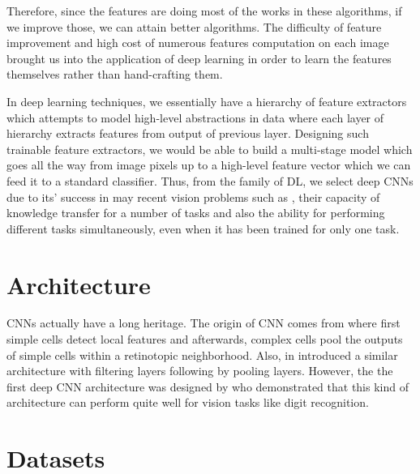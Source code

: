 \indent Therefore, since the features are doing most of the works in these algorithms, if we improve those, we can attain better algorithms. The difficulty of feature improvement and high cost of numerous features computation on each image brought us into the application of deep learning in order to learn the features themselves rather than hand-crafting them. 

In deep learning techniques, we essentially have a hierarchy of feature extractors which attempts to model high-level abstractions in data\cite{deng2014deep, bengio2009learning, bengio2013representation, arel2010deep, schmidhuber2015deep} where each layer of hierarchy extracts features from output of previous layer. Designing such trainable feature extractors, we would be able to build a multi-stage model which goes all the way from image pixels up to a high-level feature vector which we can feed it to a standard classifier. Thus, from the family of DL, we select deep CNNs due to its' success in may recent vision problems such as \cite{cirecsan2011convolutional, ciresan2015multi, wan2013regularization, cirecsan2012multi}, their capacity of knowledge transfer for a number of tasks and also the ability for performing different tasks simultaneously, even when it has been trained for only one task\cite{zhou2014learning}. 

\section{Architecture}

CNNs actually have a long heritage. The origin of CNN comes from \cite{hubel1962receptive} where first simple cells detect local features and afterwards, complex cells pool the outputs of simple cells within a retinotopic neighborhood. Also, \citeauthor*{fukushima1975cognitron} in \citeauthor*{fukushima1975cognitron, fukushima1980neocognitron} introduced a similar architecture with filtering layers following by pooling layers. However, the the first deep CNN architecture was designed by \citealt{lecun1989backpropagation} who demonstrated that this kind of architecture can perform quite well for vision tasks like digit recognition. 

\indent 
 
\section{Datasets} 


